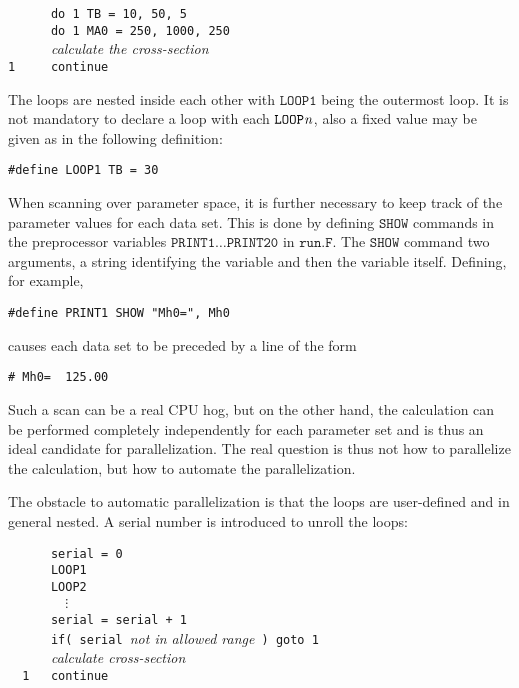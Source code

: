 \documentclass[twoside,11pt]{article}
\def\Var#1{\ensuremath{\mathit{#1}}}
\def\Vn{\Var{n}}
\def\Code#1{\ensuremath{\texttt{#1}}}
\begin{document}
\medskip
\verb|      do 1 TB = 10, 50, 5| \\
\verb|      do 1 MA0 = 250, 1000, 250| \\
\verb|      |\textit{calculate the cross-section} \\
\verb|1     continue|
\medskip

The loops are nested inside each other with \Code{LOOP1} being the
outermost loop.  It is not mandatory to declare a loop with each
\Code{LOOP\Vn}, also a fixed value may be given as in the following
definition:
\begin{verbatim}
#define LOOP1 TB = 30
\end{verbatim}

When scanning over parameter space, it is further necessary to keep
track of the parameter values for each data set.  This is done by
defining \Code{SHOW} commands in the preprocessor variables
\Code{PRINT1}$\dots$\Code{PRINT20} in \Code{run.F}.  The \Code{SHOW}
command two arguments, a string identifying the variable and then the 
variable itself.  Defining, for example,
\begin{verbatim}
#define PRINT1 SHOW "Mh0=", Mh0
\end{verbatim}
causes each data set to be preceded by a line of the form
\begin{verbatim}
# Mh0=  125.00
\end{verbatim}

Such a scan can be a real CPU hog, but on the other hand, the
calculation can be performed completely independently for each parameter
set and is thus an ideal candidate for parallelization.  The real
question is thus not how to parallelize the calculation, but how to
automate the parallelization.

The obstacle to automatic parallelization is that the loops are
user-defined and in general nested.  A serial number is introduced to
unroll the loops:

\medskip
\verb|      serial = 0| \\
\verb|      LOOP1| \\
\verb|      LOOP2| \\
\verb|        |$\vdots$ \\
\verb|      serial = serial + 1| \\
\verb|      if( serial |\textit{not in allowed range}\verb| ) goto 1| \\
\verb|      |\textit{calculate cross-section} \\
\verb|  1   continue|
\medskip
\end{document}
